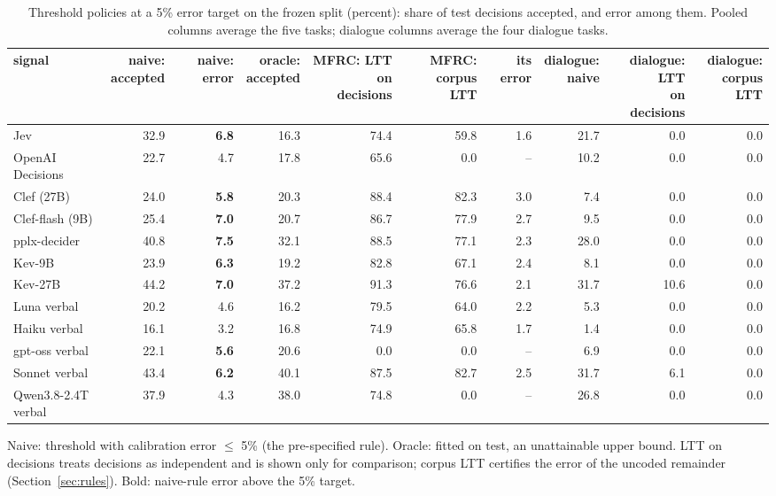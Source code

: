 \begin{table}[t]
\centering
\small
\caption{Threshold policies at a 5\% error target on the frozen split (percent): share of test decisions accepted, and error among them. Pooled columns average the five tasks; dialogue columns average the four dialogue tasks.}
\label{tab:main_policies}
\begin{adjustbox}{max width=\linewidth}
\begin{tabular}{lrrrrrrrrr}
\toprule
signal & \makecell[br]{naive: \\{} accepted} & naive: error & \makecell[br]{oracle: \\{} accepted} & \makecell[br]{MFRC: LTT on \\{} decisions} & \makecell[br]{MFRC: corpus \\{} LTT} & its error & \makecell[br]{dialogue: \\{} naive} & \makecell[br]{dialogue: LTT \\{} on decisions} & \makecell[br]{dialogue: \\{} corpus LTT} \\
\midrule
Jev & 32.9 & \textbf{6.8} & 16.3 & 74.4 & 59.8 & 1.6 & 21.7 & 0.0 & 0.0 \\
OpenAI Decisions & 22.7 & 4.7 & 17.8 & 65.6 & 0.0 & -- & 10.2 & 0.0 & 0.0 \\
Clef (27B) & 24.0 & \textbf{5.8} & 20.3 & 88.4 & 82.3 & 3.0 & 7.4 & 0.0 & 0.0 \\
Clef-flash (9B) & 25.4 & \textbf{7.0} & 20.7 & 86.7 & 77.9 & 2.7 & 9.5 & 0.0 & 0.0 \\
pplx-decider & 40.8 & \textbf{7.5} & 32.1 & 88.5 & 77.1 & 2.3 & 28.0 & 0.0 & 0.0 \\
Kev-9B & 23.9 & \textbf{6.3} & 19.2 & 82.8 & 67.1 & 2.4 & 8.1 & 0.0 & 0.0 \\
Kev-27B & 44.2 & \textbf{7.0} & 37.2 & 91.3 & 76.6 & 2.1 & 31.7 & 10.6 & 0.0 \\
\midrule
Luna verbal & 20.2 & 4.6 & 16.2 & 79.5 & 64.0 & 2.2 & 5.3 & 0.0 & 0.0 \\
Haiku verbal & 16.1 & 3.2 & 16.8 & 74.9 & 65.8 & 1.7 & 1.4 & 0.0 & 0.0 \\
gpt-oss verbal & 22.1 & \textbf{5.6} & 20.6 & 0.0 & 0.0 & -- & 6.9 & 0.0 & 0.0 \\
Sonnet verbal & 43.4 & \textbf{6.2} & 40.1 & 87.5 & 82.7 & 2.5 & 31.7 & 6.1 & 0.0 \\
Qwen3.8-2.4T verbal & 37.9 & 4.3 & 38.0 & 74.8 & 0.0 & -- & 26.8 & 0.0 & 0.0 \\
\bottomrule
\end{tabular}
\end{adjustbox}
\par\smallskip\footnotesize\raggedright Naive: threshold with calibration error $\leq$ 5\% (the pre-specified rule). Oracle: fitted on test, an unattainable upper bound. LTT on decisions treats decisions as independent and is shown only for comparison; corpus LTT certifies the error of the uncoded remainder (Section~\ref{sec:rules}). Bold: naive-rule error above the 5\% target.
\end{table}
